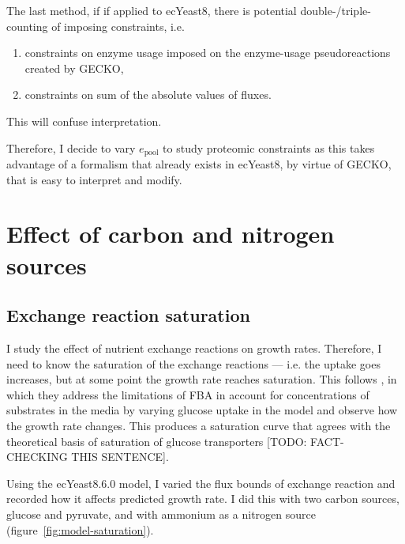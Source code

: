 The last method, if if applied to ecYeast8,
there is potential double-/triple-counting of imposing constraints, i.e.\:
\begin{enumerate}
  \item constraints on enzyme usage imposed on the enzyme-usage pseudoreactions created by GECKO,
  \item constraints on sum of the absolute values of fluxes.
\end{enumerate}
This will confuse interpretation.

Therefore, I decide to vary $e_{\mathrm{pool}}$ to study proteomic constraints as this takes advantage of a formalism that already exists in ecYeast8, by virtue of GECKO, that is easy to interpret and modify.


\section{Effect of carbon and nitrogen sources}
\label{sec:model-exchange}

\subsection{Exchange reaction saturation}
\label{subsec:model-saturation}

I study the effect of nutrient exchange reactions on growth rates.
Therefore, I need to know the saturation of the exchange reactions --- i.e. the uptake goes increases, but at some point the growth rate reaches saturation.
This follows \textcite{elsemmanWholecellModelingYeast2022}, in which they address the limitations of FBA in account for concentrations of substrates in the media by varying glucose uptake in the model and observe how the growth rate changes.
This produces a saturation curve that agrees with the theoretical basis of saturation of glucose transporters [TODO: FACT-CHECKING THIS SENTENCE].

Using the ecYeast8.6.0 model, I varied the flux bounds of exchange reaction and recorded how it affects predicted growth rate.
I did this with two carbon sources, glucose and pyruvate, and with ammonium as a nitrogen source (figure~\ref{fig:model-saturation}).

